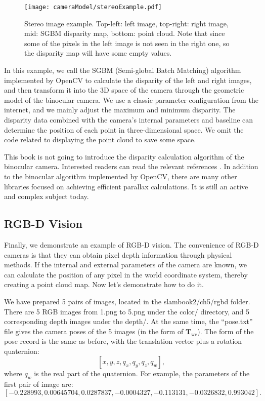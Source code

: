 \begin{figure}[!t]
    \centering
    \texttt{[image: cameraModel/stereoExample.pdf]}
    \caption{Stereo image example. Top-left: left image, top-right: right image, mid: SGBM disparity map, bottom: point cloud. Note that since some of the pixels in the left image is not seen in the right one, so the disparity map will have some empty values.}
    \label{fig:stereoExample}
\end{figure}

In this example, we call the SGBM (Semi-global Batch Matching) \textsuperscript{\cite{Hirschmuller2008}} algorithm implemented by OpenCV to calculate the disparity of the left and right images, and then transform it into the 3D space of the camera through the geometric model of the binocular camera. We use a classic parameter configuration from the internet, and we mainly adjust the maximum and minimum disparity. The disparity data combined with the camera's internal parameters and baseline can determine the position of each point in three-dimensional space. We omit the code related to displaying the point cloud to save some space.

This book is not going to introduce the disparity calculation algorithm of the binocular camera. Interested readers can read the relevant references \textsuperscript{\cite{Scharstein2002, Seitz2006}}. In addition to the binocular algorithm implemented by OpenCV, there are many other libraries focused on achieving efficient parallax calculations. It is still an active and complex subject today.

\subsection{RGB-D Vision}
\label{sec:join-point-cloud}
Finally, we demonstrate an example of RGB-D vision. The convenience of RGB-D cameras is that they can obtain pixel depth information through physical methods. If the internal and external parameters of the camera are known, we can calculate the position of any pixel in the world coordinate system, thereby creating a point cloud map. Now let's demonstrate how to do it.

We have prepared 5 pairs of images, located in the slambook2/ch5/rgbd folder. There are 5 RGB images from 1.png to 5.png under the color/ directory, and 5 corresponding depth images under the depth/. At the same time, the ``pose.txt'' file gives the camera poses of the 5 images (in the form of $ \mathbf{T}_\mathrm{wc} $). The form of the pose record is the same as before, with the translation vector plus a rotation quaternion:
\[
[x, y, z, q_x, q_y, q_z, q_w],
\]
where $q_w$ is the real part of the quaternion. For example, the parameters of the first pair of image are:
\[
[-0.228993, 0.00645704, 0.0287837, -0.0004327, -0.113131, -0.0326832, 0.993042].
\]

